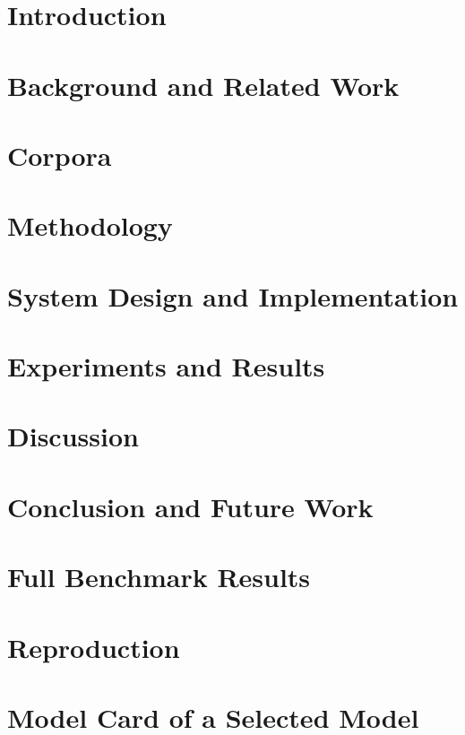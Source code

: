\documentclass[11pt,a4paper,oneside]{report}
\begin{document}
\tableofcontents
\listoffigures
\listoftables
\clearpage
{}

\chapter{Introduction}\label{ch:intro}


\chapter{Background and Related Work}\label{ch:background}


\chapter{Corpora}\label{ch:data}


\chapter{Methodology}\label{ch:method}


\chapter{System Design and Implementation}\label{ch:system}


\chapter{Experiments and Results}\label{ch:results}


\chapter{Discussion}\label{ch:discussion}


\chapter{Conclusion and Future Work}\label{ch:future}


\appendix
\chapter{Full Benchmark Results}\label{app:full}


\chapter{Reproduction}\label{app:repro}


\chapter{Model Card of a Selected Model}\label{app:card}



\end{document}
